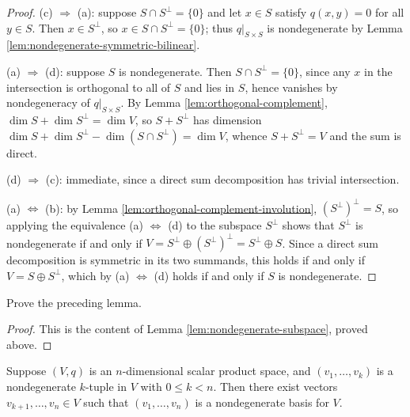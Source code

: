 \begin{proof}
\leanok
{}
(c) $\Rightarrow$ (a): suppose $S \cap S^\perp = \{0\}$ and let $x \in S$ satisfy $q(x,y) = 0$ for all $y \in S$. Then $x \in S^\perp$, so $x \in S \cap S^\perp = \{0\}$; thus $q|_{S \times S}$ is nondegenerate by Lemma \ref{lem:nondegenerate-symmetric-bilinear}.

(a) $\Rightarrow$ (d): suppose $S$ is nondegenerate. Then $S \cap S^\perp = \{0\}$, since any $x$ in the intersection is orthogonal to all of $S$ and lies in $S$, hence vanishes by nondegeneracy of $q|_{S \times S}$. By Lemma \ref{lem:orthogonal-complement}, $\dim S + \dim S^\perp = \dim V$, so $S + S^\perp$ has dimension $\dim S + \dim S^\perp - \dim(S \cap S^\perp) = \dim V$, whence $S + S^\perp = V$ and the sum is direct.

(d) $\Rightarrow$ (c): immediate, since a direct sum decomposition has trivial intersection.

(a) $\Leftrightarrow$ (b): by Lemma \ref{lem:orthogonal-complement-involution}, $(S^\perp)^\perp = S$, so applying the equivalence (a) $\Leftrightarrow$ (d) to the subspace $S^\perp$ shows that $S^\perp$ is nondegenerate if and only if $V = S^\perp \oplus (S^\perp)^\perp = S^\perp \oplus S$. Since a direct sum decomposition is symmetric in its two summands, this holds if and only if $V = S \oplus S^\perp$, which by (a) $\Leftrightarrow$ (d) holds if and only if $S$ is nondegenerate.
\end{proof}

\begin{exercise}\label{exer:preceding-lemma-nondegenerate}
\leanok
{}
Prove the preceding lemma.
\end{exercise}

\begin{proof}
\leanok
This is the content of Lemma \ref{lem:nondegenerate-subspace}, proved above.
\end{proof}

\begin{lemma}\label{lem:completion-nondegenerate-bases}
\leanok
{}
Suppose $(V,q)$ is an $n$-dimensional scalar product space, and $(v_1,\ldots,v_k)$ is a nondegenerate $k$-tuple in $V$ with $0 \leq k < n$. Then there exist vectors $v_{k+1},\ldots,v_n \in V$ such that $(v_1,\ldots,v_n)$ is a nondegenerate basis for $V$.
\end{lemma}

